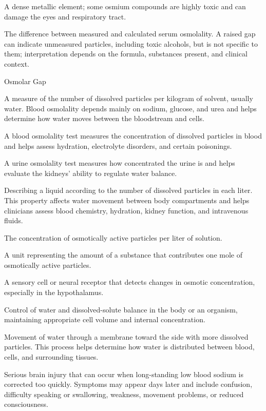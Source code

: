  A dense metallic element; some osmium compounds are highly toxic and can damage the eyes and respiratory tract.

 The difference between measured and calculated serum osmolality. A raised gap can indicate unmeasured particles, including toxic alcohols, but is not specific to them; interpretation depends on the formula, substances present, and clinical context.

\synonyms
Osmolar Gap

 A measure of the number of dissolved particles per kilogram of solvent, usually water. Blood osmolality depends mainly on sodium, glucose, and urea and helps determine how water moves between the bloodstream and cells.

 A blood osmolality test measures the concentration of dissolved particles in blood and helps assess hydration, electrolyte disorders, and certain poisonings.

 A urine osmolality test measures how concentrated the urine is and helps evaluate the kidneys' ability to regulate water balance.

 Describing a liquid according to the number of dissolved particles in each liter. This property affects water movement between body compartments and helps clinicians assess blood chemistry, hydration, kidney function, and intravenous fluids.

 The concentration of osmotically active particles per liter of solution.

 A unit representing the amount of a substance that contributes one mole of osmotically active particles.

 A sensory cell or neural receptor that detects changes in osmotic concentration, especially in the hypothalamus.

 Control of water and dissolved-solute balance in the body or an organism, maintaining appropriate cell volume and internal concentration.

 Movement of water through a membrane toward the side with more dissolved particles. This process helps determine how water is distributed between blood, cells, and surrounding tissues.

 Serious brain injury that can occur when long-standing low blood sodium is corrected too quickly. Symptoms may appear days later and include confusion, difficulty speaking or swallowing, weakness, movement problems, or reduced consciousness.

